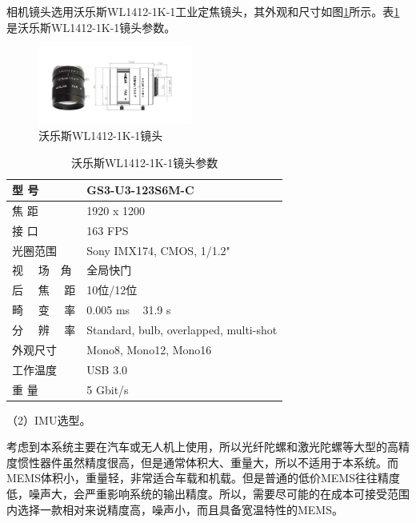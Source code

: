 相机镜头选用沃乐斯WL1412-1K-1工业定焦镜头，其外观和尺寸如图\ref{fig2_9}所示。表\ref{tab2.2}是沃乐斯WL1412-1K-1镜头参数。
\begin{figure}[!h]\setlength{\belowcaptionskip}{8pt}
	\centering
	\includegraphics[width=0.45\textwidth]{figures/chapter2/fig2_9}
	\caption{沃乐斯WL1412-1K-1镜头}\label{fig2_9}
\end{figure}
\begin{table}[!h]\setlength{\belowcaptionskip}{-12pt}
	\centering
	\caption{沃乐斯WL1412-1K-1镜头参数} \label{tab2.2}
	\begin{tabular}{m{}<{\centering} m{}<{\centering}}%
		\toprule
		型 \quad\quad 号			&GS3-U3-123S6M-C	 \\
		\midrule
		焦 \quad\quad 距	       &1920 x 1200         \\
		\midrule
		接 \quad\quad 口	    	&163 FPS	         \\
		\midrule
		光圈范围	   &Sony IMX174, CMOS, 1/1.2"	 \\
		\midrule
		视 \ \  场\ \  角	              &全局快门             \\
		\midrule
		后 \ \  焦 \ \  距                  &10位/12位           \\
		\midrule
		畸 \ \  变 \ \  率                  &0.005 ms ~ 31.9 s   \\
		\midrule
		分 \ \  辨 \ \  率                  &Standard, bulb, overlapped, multi-shot \\
		\midrule
		外观尺寸                  &Mono8, Mono12, Mono16\\
		\midrule
		工作温度                  &USB 3.0                \\
		\midrule
		重 \quad\quad 量                  &5 Gbit/s                \\
		\bottomrule
	\end{tabular}
\end{table}

（2）IMU选型。

考虑到本系统主要在汽车或无人机上使用，所以光纤陀螺和激光陀螺等大型的高精度惯性器件虽然精度很高，但是通常体积大、重量大，所以不适用于本系统。而MEMS体积小，重量轻，非常适合车载和机载。但是普通的低价MEMS往往精度低，噪声大，会严重影响系统的输出精度。所以，需要尽可能的在成本可接受范围内选择一款相对来说精度高，噪声小，而且具备宽温特性的MEMS。


